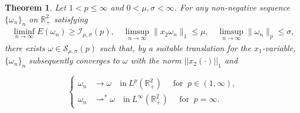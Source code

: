 \documentclass[11pt]{amsart}
\newtheorem{theorem}{Theorem}[section]
\theoremstyle{definition}
\theoremstyle{definition}
\numberwithin{equation}{section}
\newcommand{\0}{\emptyset}
\newcommand{\bbR}{\mathbb R}
\newcommand{\calI}{\mathcal I}
\newcommand{\calS}{\mathcal S}
\begin{document}
			
			\begin{theorem}\label{thm_existence_new}
				Let $1<p\leq \infty$ and $0<\mu, \sigma <\infty$. For any non-negative sequence $\{\omega_n\}_{n}$ on $\bbR^{2}_{+}$  satisfying 
				\begin{equation}\label{eq_stab_energy}
					\begin{aligned}
						{\liminf_{n \to \infty} E(\omega_n) \ge \calI_{\mu, \sigma}(p), \quad
							\limsup_{n \to \infty}\|x_2 \omega_n\|_1} \le \mu, \quad
						\limsup_{n \to \infty} \|\omega_n\|_p \le \sigma, 
					\end{aligned}
				\end{equation}
				there exists $\omega \in \calS_{\mu, \sigma}(p)$ such that, by a suitable translation for the $x_1$-variable, $\{\omega_{n} \}_n$ subsequently converges to $\omega$ with the norm $||x_2 (\cdot)||_{1}$ and 
				
				\begin{equation}
					\left\{
					\begin{aligned}
						\omega_{n}&\to \omega\quad \textrm{in}\ L^{p}(\mathbb{R}^{2}_{+})\quad \textrm{ for }\ p \in (1, \infty),\\
						\omega_{n} &\rightharpoonup^* \omega \quad \textrm{in}\ L^{\infty}(\mathbb{R}^{2}_{+})\quad \textrm{ for }\ p=\infty.
					\end{aligned}
					\right.
				\end{equation}
			\end{theorem}
			
\end{document}
